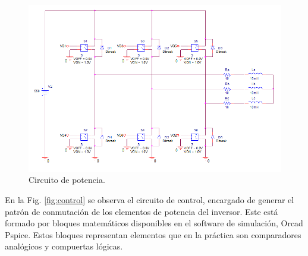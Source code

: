 \documentclass[11pt, a4paper]{article}
\begin{document}
\begin{figure}[h!]
	\centering
	\includegraphics[width=15cm]{Imagen/Conmutacion}
	\caption{Circuito de potencia.}
	\label{fig:conmutacion}
\end{figure}

En la Fig. \ref{fig:control} se observa el circuito de control, encargado de generar el patrón de conmutación de los elementos de potencia del inversor. Este está formado por bloques matemáticos disponibles en el software de simulación, Orcad Pspice. Estos bloques representan elementos que en la práctica son comparadores analógicos y compuertas lógicas.
\end{document}
